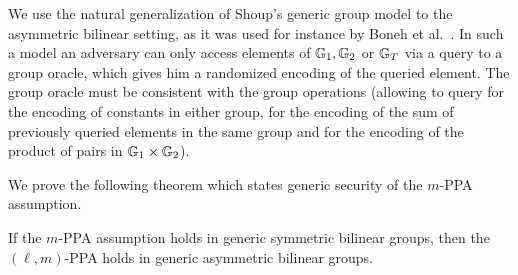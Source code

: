 We use the natural generalization of Shoup's generic group model \cite{EC:Shoup97} to the asymmetric bilinear setting, as it was used for instance by Boneh et al.~\cite{EC:BonBoyGoh05}. In such a model an adversary can only access elements of $\mathbb{G}_1,\mathbb{G}_2$ or $\mathbb{G}_T$ via a query to a group oracle, which gives him a randomized  encoding of the queried element. The group oracle must be consistent with the group operations (allowing to query for the encoding of constants in either group, for the encoding of the sum of previously queried elements in the same group and for the encoding of the product of pairs in $\mathbb{G}_1\times \mathbb{G}_2$).

We prove the following theorem which states generic security of the $m$-PPA assumption.

\begin{theorem}
	If the $m$-PPA assumption holds in generic symmetric bilinear groups, then the $(\ell,m)$-PPA holds in generic asymmetric bilinear groups.
\end{theorem}
